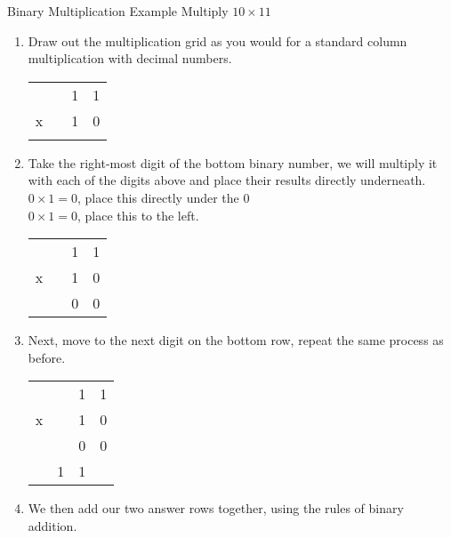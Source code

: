 \begin{example}{Binary Multiplication Example}
Multiply $10 \times 11$
\begin{enumerate}
    \item Draw out the multiplication grid as you would for a standard column multiplication with decimal numbers.
    \begin{table}[H]
        \centering
        \begin{tabularx}{0.2\textwidth}{XXXX}
             &  & 1 & 1 \\
            x &  & 1 & 0 \\
            \hline
             &  &  &  \\
        \end{tabularx}
    \end{table}
    \item Take the right-most digit of the bottom binary number, we will multiply it with each of the digits above and place their results directly underneath. \\
    $0\times 1 = 0$, place this directly under the 0\\
    $0 \times 1 = 0$, place this to the left.
    \begin{table}[H]
        \centering
        \begin{tabularx}{0.2\textwidth}{XXXX}
             &  & 1 & 1 \\
            x &  & 1 & 0 \\
            \hline
             &  & 0 & 0 \\
        \end{tabularx}
    \end{table}
    \item Next, move to the next digit on the bottom row, repeat the same process as before.
    \begin{table}[H]
        \centering
        \begin{tabularx}{0.2\textwidth}{XXXX}
             &  & 1 & 1 \\
            x &  & 1 & 0 \\
            \hline
             &  & 0 & 0 \\
             & 1 & 1 & \\
        \end{tabularx}
    \end{table}
    \item We then add our two answer rows together, using the rules of binary addition.
    \begin{table}[H]

\end{table}
\end{enumerate}
\end{example}
